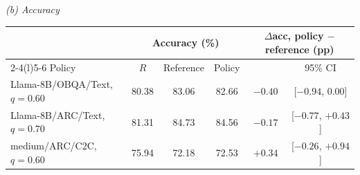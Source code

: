 \begin{table}[!htbp]
\par\vspace{17pt}
\textit{(b) Accuracy}\par\smallskip
\begin{tabular*}{\linewidth}{@{}l@{\hspace{5pt}\extracolsep{\fill}}ccccc@{}}\toprule
& \multicolumn{3}{c}{Accuracy (\%)} & \multicolumn{2}{c}{$\Delta$acc, policy $-$ reference (pp)}\\\cmidrule(lr){2-4}\cmidrule(l){5-6}
Policy & $R$ & Reference & Policy & & 95\% CI\\\midrule
Llama-8B/OBQA/Text, $q=0.60$ & 80.38 & 83.06 & 82.66 & $-0.40$ & [$-0.94$, 0.00]\\
Llama-8B/ARC/Text, $q=0.70$ & 81.31 & 84.73 & 84.56 & $-0.17$ & [$-0.77$, $+0.43$]\\
medium/ARC/C2C, $q=0.60$ & 75.94 & 72.18 & 72.53 & $+0.34$ & [$-0.26$, $+0.94$]\\\bottomrule
\end{tabular*}
\end{table}


